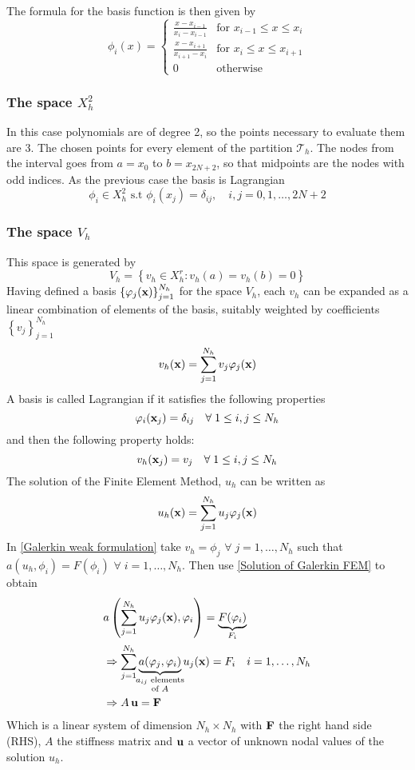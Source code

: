 The formula for the basis function is then given by 
\begin{equation}
    \phi_i(x) = \begin{cases}
        \frac{x-x_{i-1}}{x_i - x_{i-1}} & \text{for }x_{i-1} \leq x \leq x_i \\
        \frac{x-x_{i+1}}{x_{i+1} - x_i} & \text{for }x_i \leq x \leq x_{i+1} \\
        0 & \text{otherwise}
    \end{cases}
\end{equation}
\subsubsection*{The space \(X^2_h\)}
In this case polynomials are of degree 2, so the points necessary to evaluate them are \(3\). The chosen points for every element of the partition \(\mathcal{T}_h\). The nodes from the interval goes from \(a = x_0\) to \(b = x_{2N + 2}\), so that midpoints are the nodes with odd indices. As the previous case the basis is Lagrangian
\[
    \phi_i \in X^2_h \text{ s.t } \phi_i(x_j) = \delta_{ij}, \quad i, j = 0, 1, \ldots, 2N+2
\]
\subsubsection*{The space \(V_h\)}
This space is generated by 
\[
    V_h = \left\{v_h \in X^r_h : v_h(a) = v_h(b) = 0 \right\}
\]
Having defined a basis \(\left\lbrace\varphi_j(\textbf{x})\right\rbrace_{j=1}^{N_h}\) for the space \(V_h\), each \(v_h\) can be expanded as a linear combination of elements of the basis, suitably weighted by coefficients \(\left\{v_j\right\}_{j=1}^{N_h}\)
\[
    v_h(\textbf{x}) = \sum_{j=1}^{N_h} v_j \varphi_j(\textbf{x})
\]
A basis is called Lagrangian if it satisfies the following properties
\[
    \varphi_i(\textbf{x}_j) = \delta_{ij} \quad \forall \; 1 \leq i,j \leq N_h
\]
and then the following property holds:
\[
    v_h(\textbf{x}_j) = v_j \quad \forall \; 1 \leq i,j \leq N_h
\]
The solution of the Finite Element Method, \(u_h\) can be written as 
\begin{equation}
    u_h(\textbf{x}) = \sum_{j=1}^{N_h} u_j\varphi_j (\textbf{x}) \label{Solution of Galerkin FEM}
\end{equation}
In \eqref{Galerkin weak formulation} take \(v_h = \phi_j\) \(\forall \; j = 1,\ldots, N_h \) such that \(a(u_h,\phi_i) = F(\phi_i)\) \(\forall \; i = 1,\ldots,N_h\). Then use \eqref{Solution of Galerkin FEM} to obtain 
\begin{align*}
    &a\left( \sum_{j=1}^{N_h} u_j\phi_j (\vect{x}), \phi_i \right) = \underbrace{F(\phi_i)}_{F_i} \\ 
    &\Rightarrow \sum_{j=1}^{N_h} \underbrace{a(\phi_j, \phi_i)}_{\mathclap{\substack{a_{ij} \text{ elements}\\ \text{of } A}}} u_j (\vect{x}) = F_i \quad i = 1, \ldots, N_h \\
    &\Rightarrow A\,\vect{u} = \vect{F}
\end{align*}
Which is a linear system of dimension \(N_h \times N_h\) with \(\textbf{F}\) the right hand side (RHS), \(A\) the stiffness matrix and \(\textbf{u}\) a vector of unknown nodal values of the solution \(u_h\).